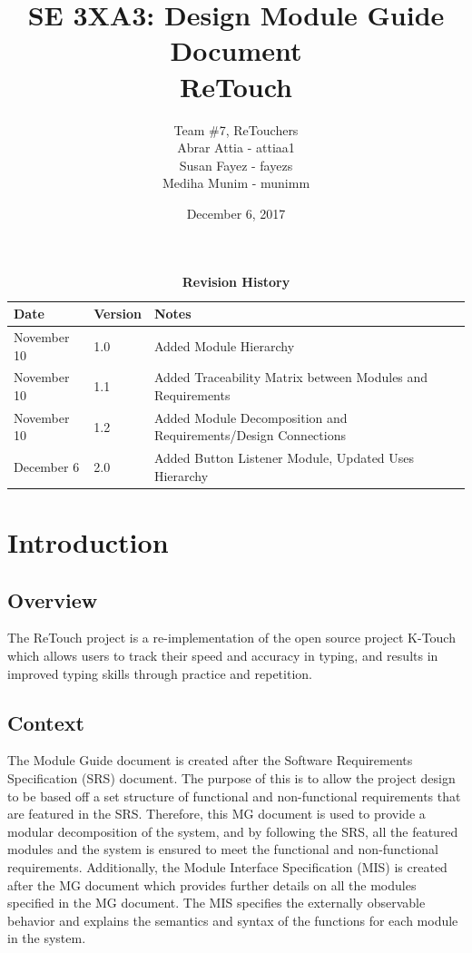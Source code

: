 \documentclass[12pt, titlepage]{article}
\title{SE 3XA3: Design Module Guide Document\\ReTouch}
\author{Team \#7, ReTouchers
		\\ Abrar Attia - attiaa1
		\\ Susan Fayez - fayezs
		\\ Mediha Munim - munimm
}
\date{December 6, 2017}
\begin{document}
\maketitle

\tableofcontents
\listoftables
\listoffigures

\begin{table}[!bp]
\caption{\bf Revision History}
\begin{tabularx}{\textwidth}{p{3cm}p{2cm}X}
\toprule {\bf Date} & {\bf Version} & {\bf Notes}\\
\midrule
November 10 & 1.0 & Added Module Hierarchy\\
November 10 & 1.1 & Added Traceability Matrix between Modules and Requirements\\
November 10 & 1.2 & Added Module Decomposition and Requirements/Design Connections\\
December 6 & 2.0 & Added Button Listener Module, Updated Uses Hierarchy\\
\bottomrule
\end{tabularx}
\end{table}

\newpage
\clearpage


\section{Introduction}

\subsection{Overview}
The ReTouch project is a re-implementation of the open source project K-Touch which allows users to track their speed and accuracy in typing, and results in improved typing skills through practice and repetition.

\subsection{Context}
The Module Guide document is created after the Software Requirements Specification (SRS) document. The purpose of this is to allow the project design to be based off a set structure of functional and non-functional requirements that are featured in the SRS. Therefore, this MG document is used to provide a modular decomposition of the system, and by following the SRS, all the featured modules and the system is ensured to meet the functional and non-functional requirements. Additionally, the Module Interface Specification (MIS) is created after the MG document which provides further details on all the modules specified in the MG document. The MIS specifies the externally observable behavior and explains the semantics and syntax of the functions for each module in the system.
\end{document}
